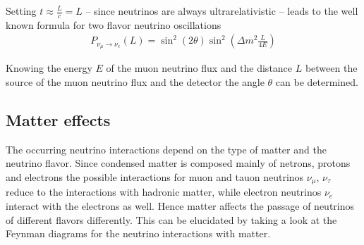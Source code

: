 Setting $t \approx \frac{L}{c} = L$ -- since neutrinos are always ultrarelativistic -- leads to the well known formula for two flavor neutrino oscillations
\begin{align*}
  P_{\nu_\mu \to \nu_e}(L) = \sin^2(2\theta) \sin^2(\Delta m^2 \frac{L}{4 E})
\end{align*}

Knowing the energy $E$ of the muon neutrino flux and the distance $L$ between the source of the muon neutrino flux and the detector the angle $\theta$ can be determined.

\subsection{Matter effects}
The occurring neutrino interactions depend on the type of matter and the neutrino flavor.
Since condensed matter is composed mainly of netrons, protons and electrons the possible interactions for muon and tauon neutrinos $\nu_\mu$, $\nu_\tau$ reduce to the interactions with hadronic matter, while electron neutrinos $\nu_e$ interact with the electrons as well.
Hence matter affects the passage of neutrinos of different flavors differently.
This can be elucidated by taking a look at the Feynman diagrams for the neutrino interactions with matter.

